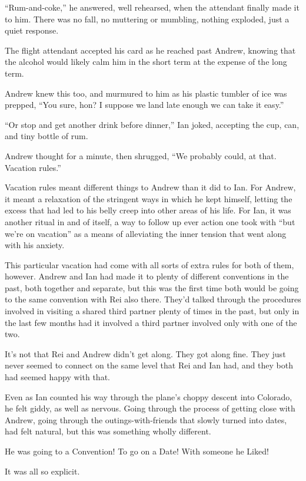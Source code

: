 ``Rum-and-coke,'' he answered, well rehearsed, when the attendant finally made it to him. There was no fall, no muttering or mumbling, nothing exploded, just a quiet response.

The flight attendant accepted his card as he reached past Andrew, knowing that the alcohol would likely calm him in the short term at the expense of the long term.

Andrew knew this too, and murmured to him as his plastic tumbler of ice was prepped, ``You sure, hon? I suppose we land late enough we can take it easy.''

``Or stop and get another drink before dinner,'' Ian joked, accepting the cup, can, and tiny bottle of rum.

Andrew thought for a minute, then shrugged, ``We probably could, at that. Vacation rules.''

Vacation rules meant different things to Andrew than it did to Ian. For Andrew, it meant a relaxation of the stringent ways in which he kept himself, letting the excess that had led to his belly creep into other areas of his life. For Ian, it was another ritual in and of itself, a way to follow up ever action one took with ``but we're on vacation'' as a means of alleviating the inner tension that went along with his anxiety.

This particular vacation had come with all sorts of extra rules for both of them, however. Andrew and Ian had made it to plenty of different conventions in the past, both together and separate, but this was the first time both would be going to the same convention with Rei also there. They'd talked through the procedures involved in visiting a shared third partner plenty of times in the past, but only in the last few months had it involved a third partner involved only with one of the two.

It's not that Rei and Andrew didn't get along. They got along fine. They just never seemed to connect on the same level that Rei and Ian had, and they both had seemed happy with that.

Even as Ian counted his way through the plane's choppy descent into Colorado, he felt giddy, as well as nervous. Going through the process of getting close with Andrew, going through the outings-with-friends that slowly turned into dates, had felt natural, but this was something wholly different.

He was going to a Convention! To go on a Date! With someone he Liked!

It was all so explicit.

